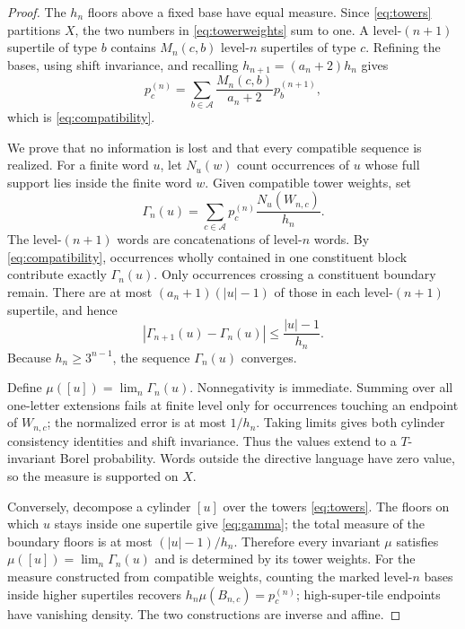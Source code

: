 \documentclass[11pt,a4paper]{amsart}
\theoremstyle{definition}
\theoremstyle{remark}
\newcommand{\A}{\mathcal A}
\begin{document}
\begin{proof}
The $h_n$ floors above a fixed base have equal measure.  Since
\eqref{eq:towers} partitions $X$, the two numbers in
\eqref{eq:towerweights} sum to one.  A level-$(n+1)$ supertile of type $b$
contains $M_n(c,b)$ level-$n$ supertiles of type $c$.  Refining the bases,
using shift invariance, and recalling $h_{n+1}=(a_n+2)h_n$ gives
\[
 p_c^{(n)}
 =\sum_{b\in\A}\frac{M_n(c,b)}{a_n+2}p_b^{(n+1)},
\]
which is \eqref{eq:compatibility}.

We prove that no information is lost and that every compatible sequence is
realized.  For a finite word $u$, let $N_u(w)$ count occurrences of $u$
whose full support lies inside the finite word $w$.  Given compatible tower
weights, set
\begin{equation}\label{eq:gamma}
 \Gamma_n(u)=\sum_{c\in\A}p_c^{(n)}
                    \frac{N_u(W_{n,c})}{h_n}.
\end{equation}
The level-$(n+1)$ words are concatenations of level-$n$ words.  By
\eqref{eq:compatibility}, occurrences wholly contained in one constituent
block contribute exactly $\Gamma_n(u)$.  Only occurrences crossing a
constituent boundary remain.  There are at most
$(a_n+1)(|u|-1)$ of those in each level-$(n+1)$ supertile, and hence
\begin{equation}\label{eq:cauchy}
 |\Gamma_{n+1}(u)-\Gamma_n(u)|
 \leq\frac{|u|-1}{h_n}.
\end{equation}
Because $h_n\geq3^{n-1}$, the sequence $\Gamma_n(u)$ converges.

Define $\mu([u])=\lim_n\Gamma_n(u)$.  Nonnegativity is immediate.  Summing
over all one-letter extensions fails at finite level only for occurrences
touching an endpoint of $W_{n,c}$; the normalized error is at most $1/h_n$.
Taking limits gives both cylinder consistency identities and shift
invariance.  Thus the values extend to a $T$-invariant Borel probability.
Words outside the directive language have zero value, so the measure is
supported on $X$.

Conversely, decompose a cylinder $[u]$ over the towers
\eqref{eq:towers}.  The floors on which $u$ stays inside one supertile give
\eqref{eq:gamma}; the total measure of the boundary floors is at most
$(|u|-1)/h_n$.  Therefore every invariant $\mu$ satisfies
$\mu([u])=\lim_n\Gamma_n(u)$ and is determined by its tower weights.
For the measure constructed from compatible weights, counting the marked
level-$n$ bases inside higher supertiles recovers
$h_n\mu(B_{n,c})=p_c^{(n)}$; high-super-tile endpoints have vanishing
density.  The two constructions are inverse and affine.
\end{proof}
\end{document}
